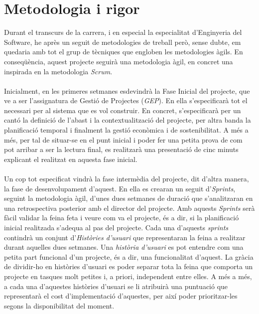 
\section{Metodologia i rigor}

Durant el transcurs de la carrera, i en especial la especialitat d'Enginyeria del Software, he après un seguit de metodologies de treball però, sense dubte, em quedaria amb tot el grup de tècniques que engloben les metodologies àgils. En conseqüència, aquest projecte seguirà una metodologia àgil, en concret una inspirada en la metodologia \textit{Scrum}.
\\\\
Inicialment, en les primeres setmanes esdevindrà la Fase Inicial del projecte, que ve a ser l'assignatura de Gestió de Projectes (\textit{GEP}). En ella s'especificarà tot el necessari per al sistema que es vol construir. En concret, s'especificarà per un cantó la definició de l'abast i la contextualització del projecte, per altra banda la planificació temporal i finalment la gestió econòmica i de sostenibilitat. A més a més, per tal de situar-se en el punt inicial i poder fer una petita prova de com pot arribar a ser la lectura final, es realitzarà una presentació de cinc minuts explicant el realitzat en aquesta fase inicial.
\\\\
Un cop tot especificat vindrà la fase intermèdia del projecte, dit d'altra manera, la fase de desenvolupament d'aquest. En ella es crearan un seguit d'\textit{Sprints}, seguint la metodologia àgil, d'unes dues setmanes de duració que s'analitzaran en una retrospectiva posterior amb el director del projecte. Amb aquests \textit{Sprints} serà fàcil validar la feina feta i veure com va el projecte, és a dir, si la planificació inicial realitzada s'adequa al pas del projecte. Cada una d'aquests \textit{sprints} contindrà un conjunt d'\textit{Històries d'usuari} que representaran la feina a realitzar durant aquelles dues setmanes. Una \textit{història d'usuari} es pot entendre com una petita part funcional d'un projecte, és a dir, una funcionalitat d'aquest. La gràcia de dividir-ho en històries d'usuari es poder separar tota la feina que comporta un projecte en tasques molt petites i, a priori, independent entre elles. A més a més, a cada una d'aquestes històries d'usuari se li atribuirà una puntuació que representarà el cost d'implementació d'aquestes, per així poder prioritzar-les segons la disponibilitat del moment.
